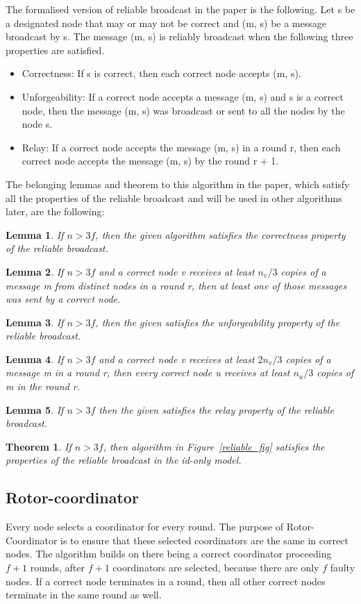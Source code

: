 \documentclass{article}
\newtheorem{theorem}{Theorem}[section]
\newtheorem{lemma}{Lemma}[section]
\begin{document}
The formalised version of reliable broadcast in the paper is the following. Let s be a designated node that may or may not be correct and (m, s) be a message broadcast by s. The message (m, s) is reliably broadcast when the following three properties are satisfied.

\begin{itemize}
  \item Correctness: If s is correct, then each correct node accepts (m, s).
  \item Unforgeability: If a correct node accepts a message (m, s) and s is a correct node, then the message (m, s) was broadcast or sent to all the nodes by the node s.
  \item Relay: If a correct node accepts the message (m, s) in a round r, then each correct node accepts the message (m, s) by the round r + 1.
\end{itemize}

The belonging lemmas and theorem to this algorithm in the paper, which satisfy all the properties of the reliable broadcast and will be used in other algorithms later, are the following:
\begin{lemma}
If \(n > 3f\), then the given algorithm satisfies the correctness property of the reliable broadcast.
\end{lemma}
\begin{lemma}
If \(n > 3f\) and a correct node v receives at least \(n_v/3\) copies of a message m from distinct nodes in a round r, then at least one of those messages was sent by a correct node.
\end{lemma}
\begin{lemma}
If \(n > 3f\), then the given satisfies the unforgeability property of the reliable broadcast.
\end{lemma}
\begin{lemma}
If \(n > 3f\) and a correct node v receives at least \(2n_v/3\) copies of a message m in a round r, then every correct node u receives at least \(n_u/3\) copies of m in the round r.
\end{lemma}
\begin{lemma}
If \(n > 3f\) then the given satisfies the relay property of the reliable broadcast.
\end{lemma}
\begin{theorem}
If \(n > 3f\), then algorithm in Figure~\ref{reliable_fig} satisfies the properties of the reliable broadcast in the id-only model.
\end{theorem}
\subsection{Rotor-coordinator}
Every node selects a coordinator for every round. The purpose of Rotor-Coordinator is to ensure that these selected coordinators are the same in correct nodes. The algorithm builds on there being a correct coordinator proceeding \(f + 1\) rounds, after \(f + 1\) coordinators are selected, because there are only \(f\) faulty nodes. If a correct node terminates in a round, then all other correct nodes terminate in the same round as well. 
\end{document}
